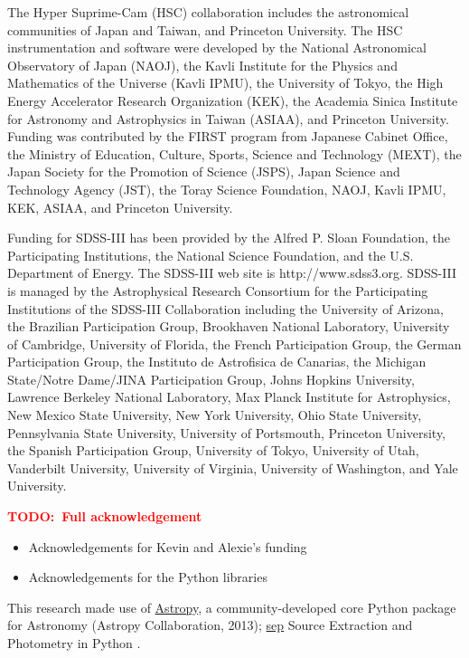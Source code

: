 \documentclass[preprint]{aastex}
\newcommand{\todo}[1]{\textcolor{red}{\textbf{TODO:~#1}}}
\begin{document}
\begin{CJK*}{UTF8}{gbsn}
\acknowledgements
  The Hyper Suprime-Cam (HSC) collaboration includes the astronomical communities of Japan
  and Taiwan, and Princeton University.  The HSC instrumentation and software were
  developed by the National Astronomical Observatory of Japan (NAOJ), the Kavli Institute
  for the Physics and Mathematics of the Universe (Kavli IPMU), the University of Tokyo,
  the High Energy Accelerator Research Organization (KEK), the Academia Sinica Institute
  for Astronomy and Astrophysics in Taiwan (ASIAA), and Princeton University.  Funding was
  contributed by the FIRST program from Japanese Cabinet Office, the Ministry of
  Education, Culture, Sports, Science and Technology (MEXT), the Japan Society for the
  Promotion of Science (JSPS),  Japan Science and Technology Agency (JST),  the Toray
  Science  Foundation, NAOJ, Kavli IPMU, KEK, ASIAA,  and Princeton University.
   
  Funding for SDSS-III has been provided by the Alfred P. Sloan Foundation, the
  Participating Institutions, the National Science Foundation, and the U.S.  Department of
  Energy. The SDSS-III web site is http://www.sdss3.org.  SDSS-III is managed by the
  Astrophysical Research Consortium for the Participating Institutions of the SDSS-III
  Collaboration including the University of Arizona, the Brazilian Participation Group,
  Brookhaven National Laboratory, University of Cambridge, University of Florida, the
  French Participation Group, the German Participation Group, the Instituto de Astrofisica
  de Canarias, the Michigan State/Notre Dame/JINA Participation Group, Johns Hopkins
  University, Lawrence Berkeley National Laboratory, Max Planck Institute for
  Astrophysics, New Mexico State University, New York University, Ohio State University,
  Pennsylvania State University, University of Portsmouth, Princeton University, the
  Spanish Participation Group, University of Tokyo, University of Utah, Vanderbilt
  University, University of Virginia, University of Washington, and Yale University.
  
  \todo{Full acknowledgement}\\
  \begin{itemize}
      \item Acknowledgements for Kevin and Alexie's funding 
      \item Acknowledgements for the Python libraries
  \end{itemize}

  This research made use of 
  \href{http://www.astropy.org/}{Astropy}, a community-developed 
  core Python package for Astronomy (Astropy Collaboration, 2013); 
  \href{https://github.com/kbarbary/sep}{sep} 
  Source Extraction and Photometry in Python \citep{PythonSEP}.


\end{CJK*}
\end{document}
